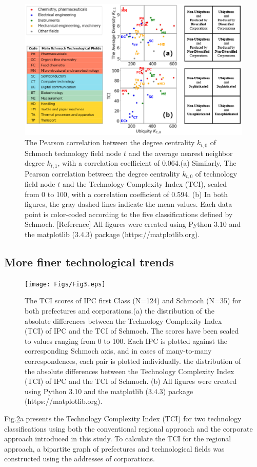 \documentclass[fleqn,10pt]{wlscirep}
\begin{document}

\begin{figure}[ht]
    \centering
    \includegraphics[scale=0.75]{Figs/Fig2.eps}
    \caption{The Pearson correlation between the degree centrality \( k_{t,0} \) of Schmoch technology field node \( t \) and the average nearest neighbor degree \( k_{t,1} \), with a correlation coefficient of 0.064.(a) Similarly, The Pearson correlation between the degree centrality \( k_{t,0} \) of technology field node \( t \) and the Technology Complexity Index (TCI), scaled from 0 to 100, with a correlation coefficient of 0.594. (b) In both figures, the gray dashed lines indicate the mean values. Each data point is color-coded according to the five classifications defined by Schmoch. [Reference]
    All figures were created using Python 3.10 and the matplotlib (3.4.3) package (https://matplotlib.org).}
    \label{fig:scatter}
\end{figure}


\subsection*{More finer technological trends}
\begin{figure}[ht]
    \centering
    \texttt{[image: Figs/Fig3.eps]}
    \caption{The TCI scores of IPC first Class (N=124) and Schmoch (N=35) for both prefectures and corporations.(a) the distribution of the absolute differences between the Technology Complexity Index (TCI) of IPC and the TCI of Schmoch. The scores have been scaled to values ranging from 0 to 100. Each IPC is plotted against the corresponding Schmoch axis, and in cases of many-to-many correspondences, each pair is plotted individually.
    the distribution of the absolute differences between the Technology Complexity Index (TCI) of IPC and the TCI of Schmoch. (b)
    All figures were created using Python 3.10 and the matplotlib (3.4.3) package (https://matplotlib.org).}
    \label{fig:detailtci}
\end{figure}
Fig.\ref{fig:detailtci}a presents the Technology Complexity Index (TCI) for two technology classifications using both the conventional regional approach and the corporate approach introduced in this study. 
To calculate the TCI for the regional approach, a bipartite graph of prefectures and technological fields was constructed using the addresses of corporations.
\end{document}
